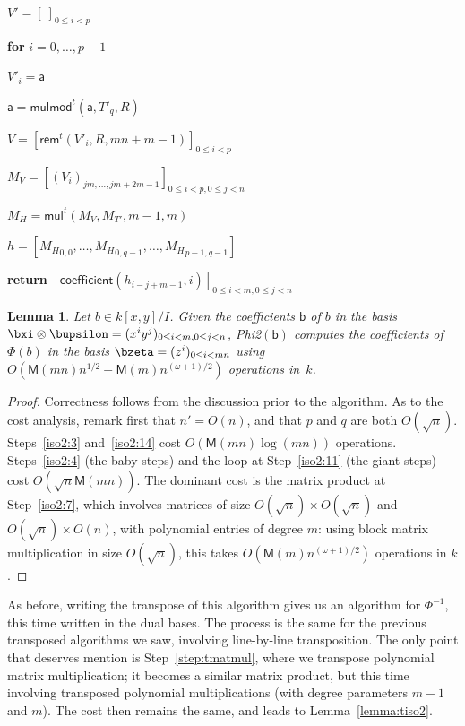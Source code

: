 \documentclass{sig-alternate}
\def\M {\ensuremath{\mathsf{M}}}
\def\va {\ensuremath{\mathsf{a}}}
\def\vb {\ensuremath{\mathsf{b}}}
\def\mul {\ensuremath{\mathsf{mul}}}
\def\rem {\ensuremath{\mathsf{rem}}}
\def\coeff {\ensuremath{\mathsf{coefficient}}}
\def\mulmod {\ensuremath{\mathsf{mulmod}}}
\newcounter{algo}
\newenvironment{algorithm_endline}[4]{\small\begin{center}\begin{minipage}{0.48\textwidth}
      \refstepcounter{algo}
      \label{#4}
      \sf
      \rule{\textwidth}{0.2pt}\\
      \makebox[\textwidth][c]{Algorithm~\arabic{algo}:~\textbf{#1}}\\
      \rule[0.5\baselineskip]{\textwidth}{0.2pt}\\

      \vspace{-12pt}

      \parbox{\textwidth}{\textbf{Input} #2}
      \parbox{\textwidth}{\textbf{Output} #3}

\vspace{-7pt}

      \begin{enumerate*}}{\end{enumerate*}
      \vspace{-11pt}
      \rule{\textwidth}{0.2pt}
\end{minipage}\end{center}
}
\newtheorem{Lemma}{Lemma}
\begin{document}
\begin{algofloat}[t]
\begin{algorithm_endline}
\item $V'=[\ ]_{0 \le i < p}$
\item {\bf for} {$i=0,\dots,p-1$}
\item \hspace{7mm} $V'_i = \va$
\item \hspace{7mm} $\va = \mulmod^t(\va,T'_q,R)$
\item $V = [\rem^t(V'_i,R,mn+m-1)]_{0 \le i < p}$
\item $M_V = [(V_{i})_{jm,\dots,jm+2m-1}]_{0 \le i < p, 0 \le j < n}$
\item\label{step:tmatmul} $M_H = \mul^t(M_V, M_{T'},m-1,m)$
\item $h=[{M_H}_{0,0},\dots,{M_H}_{0,q-1},\dots,{M_H}_{p-1,q-1}]$
\item {\bf return} $[\coeff(h_{i-j+m-1},i)]_{0 \le i < m, 0 \le j < n}$
  \end{algorithm_endline}
\vspace{-5ex}
\end{algofloat}

\begin{Lemma}
  Let $b \in k[x,y]/I$. Given the coefficients $\vb$ of $b$ in the
  basis $\bxi \otimes \bupsilon=(x^i y^j)_{0 \le i < m, 0 \le j < n}$,
  {\sf Phi2}$(\vb)$ computes the coefficients of $\Phi(b)$ in the
  basis $\bzeta=(z^i)_{0 \le i < mn}$ using $O(\M(mn)n^{1/2}+\M(m)
  n^{(\omega+1)/2} )$ operations in~$k$.
\end{Lemma}
\begin{proof}
  Correctness follows from the discussion prior to the algorithm.  As
  to the cost analysis, remark first that $n'=O(n)$, and that $p$ and
  $q$ are both $O(\sqrt{n})$. Steps~\ref{iso2:3} and~\ref{iso2:14}
  cost $O(\M(mn)\log(mn))$ operations. Steps~\ref{iso2:4} (the baby
  steps) and the loop at Step~\ref{iso2:11} (the giant steps) cost
  $O(\sqrt{n}\M(mn))$. The dominant cost is the matrix product at
  Step~\ref{iso2:7}, which involves matrices of size $O(\sqrt{n})
  \times O(\sqrt{n})$ and $O(\sqrt{n}) \times O(n)$, with polynomial
  entries of degree $m$: using block matrix multiplication in size
  $O(\sqrt{n})$, this takes $O(\M(m) n^{(\omega+1)/2})$ operations in
  $k$.
\end{proof}

As before, writing the transpose of this algorithm gives us an
algorithm for $\Phi^{-1}$, this time written in the dual bases.  The
process is the same for the previous transposed algorithms we saw,
involving line-by-line transposition. The only point that deserves
mention is Step~\ref{step:tmatmul}, where we transpose polynomial
matrix multiplication; it becomes a similar matrix product, but this
time involving transposed polynomial multiplications (with degree
parameters $m-1$ and $m$). The cost then remains the same, and leads to
Lemma~\ref{lemma:tiso2}.
\end{document}
